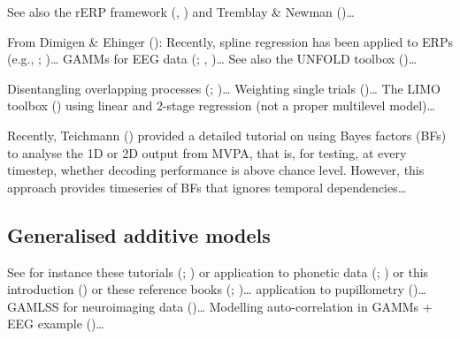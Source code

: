 \documentclass[
  doc,
  floatsintext,
  longtable,
  a4paper,
  nolmodern,
  notxfonts,
  notimes,
  donotrepeattitle,
  colorlinks=true,linkcolor=blue,citecolor=blue,urlcolor=blue]{apa7}
\begin{document}
See also the rERP framework (, ) and Tremblay \& Newman
()\ldots{}

From Dimigen \& Ehinger (): Recently,
spline regression has been applied to ERPs (e.g.,
;
)\ldots{} GAMMs
for EEG data (;
,
)\ldots{} See also the UNFOLD toolbox
()\ldots{}

Disentangling overlapping processes
(;
)\ldots{}
Weighting single trials ()\ldots{} The LIMO toolbox () using linear and 2-stage regression (not a proper multilevel
model)\ldots{}

Recently, Teichmann () provided a
detailed tutorial on using Bayes factors (BFs) to analyse the 1D or 2D
output from MVPA, that is, for testing, at every timestep, whether
decoding performance is above chance level. However, this approach
provides timeseries of BFs that ignores temporal dependencies\ldots{}

\subsection{Generalised additive
models}\label{generalised-additive-models}

See for instance these tutorials
(;
) or application to
phonetic data (;
) or this introduction
() or these reference
books (;
)\ldots{} application to
pupillometry ()\ldots{}
GAMLSS for neuroimaging data ()\ldots{} Modelling auto-correlation in GAMMs + EEG example
()\ldots{}
\end{document}
